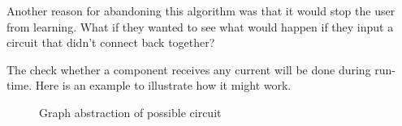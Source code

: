         Another reason for abandoning this algorithm was that it would stop the user from learning. 
        What if they wanted to see what would happen if they input a circuit that didn't connect back together? 

        The check whether a component receives any current will be done during run-time. 
        Here is an example to illustrate how it might work. 

        \begin{figure}[!ht]
            \centering
            \caption{Graph abstraction of possible circuit}
            \label{fig:example-circuit-traversal}
        \end{figure}

